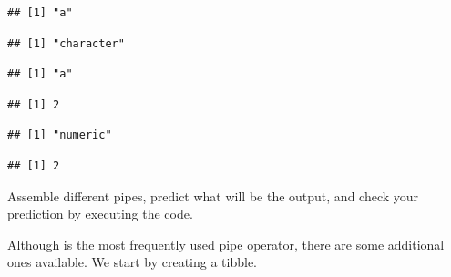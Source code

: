 \documentclass[krantz2,ChapterTOCs]{krantz}\usepackage{knitr}
\begin{document}
\begin{explainbox}
\begin{knitrout}\footnotesize
{}\color{fgcolor}\begin{kframe}
\begin{alltt}
 \hlkwb{<-} \hlstd{(}\hlstd{)}
\end{alltt}
\begin{verbatim}
## [1] "a"
\end{verbatim}
\begin{alltt}
\end{alltt}
\begin{verbatim}
## [1] "character"
\end{verbatim}
\begin{alltt}
\end{alltt}
\begin{verbatim}
## [1] "a"
\end{verbatim}
\begin{alltt}
 \hlkwb{<-} \hlstd{(}\hlstd{)}
\end{alltt}
\begin{verbatim}
## [1] 2
\end{verbatim}
\begin{alltt}
\end{alltt}
\begin{verbatim}
## [1] "numeric"
\end{verbatim}
\begin{alltt}
\end{alltt}
\begin{verbatim}
## [1] 2
\end{verbatim}
\end{kframe}
\end{knitrout}

\end{explainbox}

\begin{playground}
Assemble different pipes, predict what will be the output, and check your prediction by executing the code.
\end{playground}

Although \Roperator{\%>\%} is the most frequently used pipe operator, there are some additional ones available. We start by creating a tibble.

\begin{knitrout}\footnotesize
{}\color{fgcolor}\begin{kframe}
\begin{alltt}
 \hlkwb{<-} \hlstd{(} \hlstd{=} \hlopt{:}\hlstd{,}  \hlstd{=} \hlstd{(letters[}\hlopt{:}\hlstd{],} \hlstd{))}
\end{alltt}
\end{kframe}
\end{knitrout}
\end{document}
